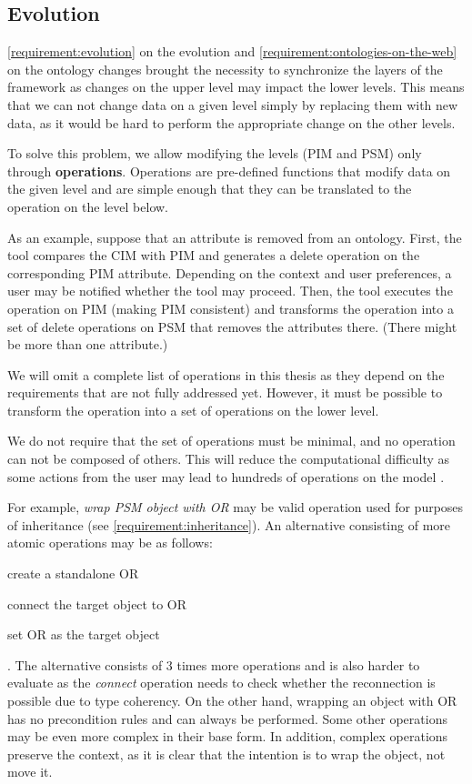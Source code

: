 \subsection{Evolution}

\autoref{requirement:evolution} on the evolution and \autoref{requirement:ontologies-on-the-web} on the ontology changes brought the necessity to synchronize the layers of the framework as changes on the upper level may impact the lower levels. This means that we can not change data on a given level simply by replacing them with new data, as it would be hard to perform the appropriate change on the other levels.

To solve this problem, we allow modifying the levels (PIM and PSM) only through \textbf{operations}. Operations are pre-defined functions that modify data on the given level and are simple enough that they can be translated to the operation on the level below.

As an example, suppose that an attribute is removed from an ontology. First, the tool compares the CIM with PIM and generates a delete operation on the corresponding PIM attribute. Depending on the context and user preferences, a user may be notified whether the tool may proceed. Then, the tool executes the operation on PIM (making PIM consistent) and transforms the operation into a set of delete operations on PSM that removes the attributes there. (There might be more than one attribute.)

We will omit a complete list of operations in this thesis as they depend on the requirements that are not fully addressed yet. However, it must be possible to transform the operation into a set of operations on the lower level.

We do not require that the set of operations must be minimal, and no operation can not be composed of others. This will reduce the computational difficulty as some actions from the user may lead to hundreds of operations on the model \cite{nevcasky2012evolution}.

For example, \textit{wrap PSM object with OR} may be valid operation used for purposes of inheritance (see \autoref{requirement:inheritance}). An alternative consisting of more atomic operations may be as follows:
\begin{enumerate*}[label={(\arabic*)}]
    \item create a standalone OR
    \item connect the target object to OR
    \item set OR as the target object
\end{enumerate*}. The alternative consists of 3 times more operations and is also harder to evaluate as the \textit{connect} operation needs to check whether the reconnection is possible due to type coherency. On the other hand, wrapping an object with OR has no precondition rules and can always be performed. Some other operations may be even more complex in their base form. In addition, complex operations preserve the context, as it is clear that the intention is to wrap the object, not move it.

